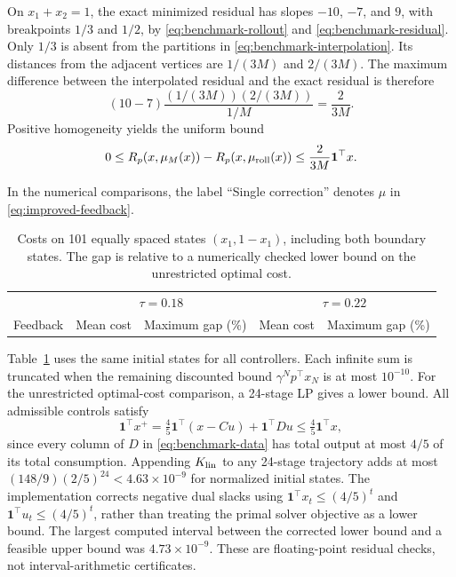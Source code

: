 \documentclass[10pt]{article}
\newcommand{\one}{\mathbf 1}
\begin{document}
On $x_1+x_2=1$, the exact minimized residual has slopes $-10$, $-7$, and $9$, with breakpoints $1/3$ and $1/2$, by \eqref{eq:benchmark-rollout} and \eqref{eq:benchmark-residual}. Only $1/3$ is absent from the partitions in \eqref{eq:benchmark-interpolation}. Its distances from the adjacent vertices are $1/(3M)$ and $2/(3M)$. The maximum difference between the interpolated residual and the exact residual is therefore
\[
 (10-7)\frac{(1/(3M))(2/(3M))}{1/M}=\frac{2}{3M}.
\]
Positive homogeneity yields the uniform bound
\begin{equation}
 0\le R_p(x,\mu_M(x))-R_p(x,\mu_{\rm roll}(x))
 \le\frac{2}{3M}\one^\top x.
 \label{eq:benchmark-error}
\end{equation}

In the numerical comparisons, the label ``Single correction'' denotes $\mu$ in \eqref{eq:improved-feedback}.
\begin{table}[htbp]
\centering
\begin{tabular}{lrrrr}
\hline
&\multicolumn{2}{c}{$\tau=0.18$}&\multicolumn{2}{c}{$\tau=0.22$}\\
Feedback & Mean cost & Maximum gap (\%) & Mean cost & Maximum gap (\%)\\
\hline

\end{tabular}
\caption{Costs on 101 equally spaced states $(x_1,1-x_1)$, including both boundary states. The gap is relative to a numerically checked lower bound on the unrestricted optimal cost.}
\label{tab:benchmark-grid}
\end{table}

Table~\ref{tab:benchmark-grid} uses the same initial states for all controllers. Each infinite sum is truncated when the remaining discounted bound $\gamma^Np^\top x_N$ is at most $10^{-10}$. For the unrestricted optimal-cost comparison, a 24-stage LP gives a lower bound. All admissible controls satisfy
\[
 \one^\top x^+
 =\tfrac45\one^\top(x-Cu)+\one^\top Du
 \le\tfrac45\one^\top x,
\]
since every column of $D$ in \eqref{eq:benchmark-data} has total output at most $4/5$ of its total consumption. Appending $K_{\rm lin}$ to any 24-stage trajectory adds at most $(148/9)(2/5)^{24}<4.63\times10^{-9}$ for normalized initial states. The implementation corrects negative dual slacks using $\one^\top x_t\le(4/5)^t$ and $\one^\top u_t\le(4/5)^t$, rather than treating the primal solver objective as a lower bound. The largest computed interval between the corrected lower bound and a feasible upper bound was $4.73\times10^{-9}$. These are floating-point residual checks, not interval-arithmetic certificates.
\end{document}
